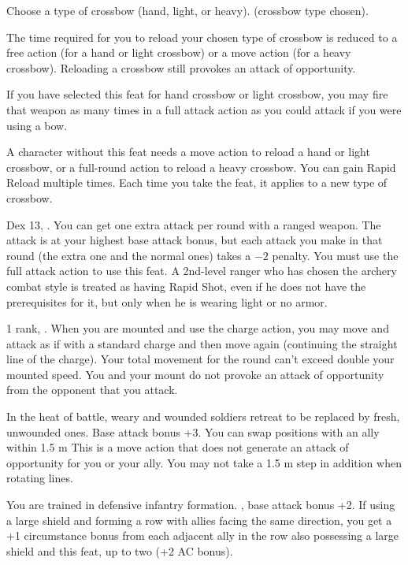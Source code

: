 {Choose a type of crossbow (hand, light, or heavy).}
{ (crossbow type chosen).}
{The time required for you to reload your chosen type of crossbow is reduced to a free action (for a hand or light crossbow) or a move action (for a heavy crossbow). Reloading a crossbow still provokes an attack of opportunity.

If you have selected this feat for hand crossbow or light crossbow, you may fire that weapon as many times in a full attack action as you could attack if you were using a bow.}
{A character without this feat needs a move action to reload a hand or light crossbow, or a full-round action to reload a heavy crossbow.}
{You can gain Rapid Reload multiple times. Each time you take the feat, it applies to a new type of crossbow.}

{}
{Dex 13, .}
{You can get one extra attack per round with a ranged weapon. The attack is at your highest base attack bonus, but each attack you make in that round (the extra one and the normal ones) takes a $-2$ penalty. You must use the full attack action to use this feat.}{}
{A 2nd-level ranger who has chosen the archery combat style is treated as having Rapid Shot, even if he does not have the prerequisites for it, but only when he is wearing light or no armor.}

{ 1 rank, .}
{When you are mounted and use the charge action, you may move and attack as if with a standard charge and then move again (continuing the straight line of the charge). Your total movement for the round can't exceed double your mounted speed. You and your mount do not provoke an attack of opportunity from the opponent that you attack.}

{In the heat of battle, weary and wounded soldiers retreat to be replaced by fresh, unwounded ones.}
{Base attack bonus +3.}
{You can swap positions with an ally within 1.5 m This is a move action that does not generate an attack of opportunity for you or your ally. You may not take a 1.5 m step in addition when rotating lines.}{}{}

{You are trained in defensive infantry formation.}
{, base attack bonus +2.}
{If using a large shield and forming a row with allies facing the same direction, you get a +1 circumstance bonus from each adjacent ally in the row also possessing a large shield and this feat, up to two (+2 AC bonus).}{}{}


